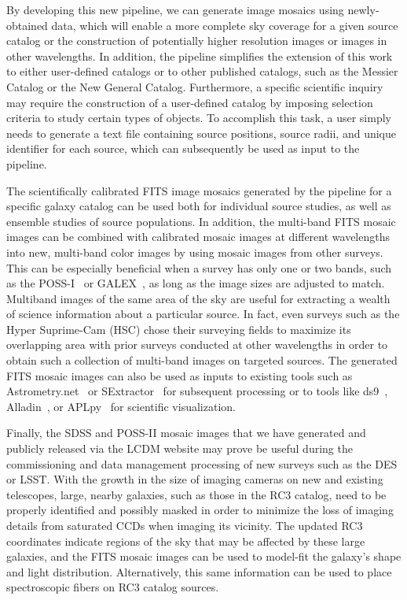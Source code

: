 \documentclass[authoryear, 12pt, 5p, times]{elsarticle}
\begin{document}
By developing this new pipeline, we can generate image mosaics using newly-obtained data, which will enable a more complete sky coverage for a given source catalog or the construction of potentially higher resolution images or images in other wavelengths. In addition, the pipeline simplifies the extension of this work to either user-defined catalogs or to other published catalogs, such as the Messier Catalog or the New General Catalog. Furthermore, a specific scientific inquiry may require the construction of a user-defined catalog  by imposing selection criteria to study certain types of objects. To accomplish this task, a user simply needs to generate a text file containing source positions, source radii, and unique identifier for each source, which can subsequently be used as input to the pipeline. 


The scientifically calibrated FITS image mosaics generated by the pipeline for a specific galaxy catalog can be used both for individual source studies, as well as ensemble studies of source populations. In addition, the multi-band FITS mosaic images can be combined with calibrated mosaic images at different wavelengths into new, multi-band color images by using mosaic images from other surveys. This can be especially beneficial when a survey has only one or two bands, such as the POSS-I~\citep{poss1} or GALEX~\citep{galex}, as long as the image sizes are adjusted to match. Multiband images of the same area of the sky are useful for extracting a wealth of science information about a particular source. In fact, even surveys such as the Hyper Suprime-Cam (HSC) chose their surveying fields to maximize its overlapping area with prior surveys conducted at other wavelengths in order to obtain such a collection of multi-band images on targeted sources. The generated FITS mosaic images can also be used as inputs to existing tools such as Astrometry.net~\citep{astrometry.net} or SExtractor~\citep{sextractor} for subsequent processing or to tools like ds9~\citep{ds9}, Alladin~\citep{aladin}, or APLpy~\citep{aplpy} for scientific visualization.

Finally, the SDSS and POSS-II mosaic images that we have generated and publicly released via the LCDM website may prove be useful during the commissioning and data management processing of new surveys such as the DES or LSST. With the growth in the size of  imaging cameras on new and existing telescopes, large, nearby galaxies, such as those in the RC3 catalog, need to be properly identified and possibly masked in order to minimize the loss of imaging details from saturated CCDs when imaging its vicinity. The updated RC3 coordinates indicate regions of the sky that may be affected by these large galaxies, and the FITS mosaic images can be used to model-fit the galaxy's shape and light distribution. Alternatively, this same information can be used to place spectroscopic fibers on RC3 catalog sources. 
\end{document}
